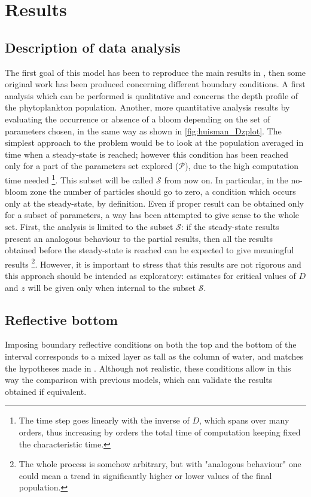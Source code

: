 \section{Results}
\subsection{Description of data analysis} \label{sec:stoc_descr}
The first goal of this model has been to reproduce the main results in \autocite{Huisman2002HowPersist}, then some original work has been produced concerning different boundary conditions.
A first analysis which can be performed is qualitative and concerns the depth profile of the phytoplankton population. Another, more quantitative analysis results by evaluating the occurrence or absence of a bloom depending on the set of parameters chosen, in the same way as shown in \autoref{fig:huisman_Dzplot}. The simplest approach to the problem would be to look at the population averaged in time when a steady-state is reached; however this condition has been reached only for a part of the parameters set explored ($\mathcal{P}$), due to the high computation time needed 
\footnote{%
The time step goes linearly with the inverse of $D$, which spans over many orders, thus increasing by orders the total time of computation keeping fixed the characteristic time.}. This subset will be called $\mathcal{S}$ from now on.
In particular, in the no-bloom zone the number of particles should go to zero, a condition which occurs only at the steady-state, by definition.
Even if proper result can be obtained only for a subset of parameters, a way has been attempted to give sense to the whole set. First, the analysis is limited to the subset $\mathcal{S}$: if the steady-state results present an analogous behaviour to the partial results, then all the results obtained before the steady-state is reached can be expected to give meaningful results
\footnote{The whole process is somehow arbitrary, but with "analogous behaviour" one could mean a trend in significantly higher or lower values of the final population.}. However, it is important to stress that this results are not rigorous and this approach should be intended as exploratory: estimates for critical values of $D$ and $z$ will be given only when internal to the subset $\mathcal{S}$.

\subsection{Reflective bottom} \label{sec:stoc_refl}
Imposing boundary reflective conditions on both the top and the bottom of the interval corresponds to a mixed layer as tall as the column of water, and matches the hypotheses made in \autocite{Huisman2002HowPersist}. Although not realistic, these conditions allow in this way the comparison with previous models, which can validate the results obtained if equivalent. 

